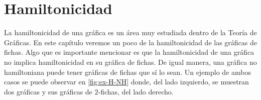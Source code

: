 \chapter{Hamiltonicidad}%
\label{cap:hamilt}

La hamiltonicidad de una gr\'afica es un \'area muy estudiada dentro de la
Teor\'ia de Gr\'aficas. En este cap\'itulo veremos un poco de la hamiltonicidad
de las gr\'aficas de fichas. Algo que es importante mencionar es que la
hamiltonicidad de una gr\'afica no implica hamiltonicidad en su gr\'afica de
fichas. De igual manera, una gr\'afica no hamiltoniana puede tener gr\'aficas de
fichas que s\'i lo sean. Un ejemplo de ambos casos se puede observar en
\cref{fig:ex-H-NH} donde, del lado izquierdo, se muestran dos gr\'aficas y sus
gr\'aficas de $2$-fichas, del lado derecho.


